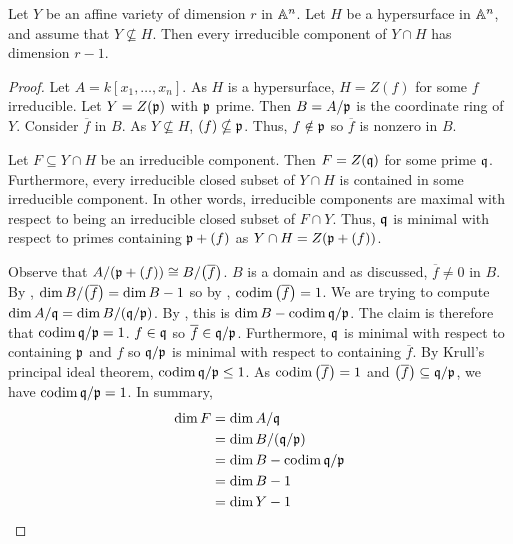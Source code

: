 \label{1.1.8}

Let $Y$ be an affine variety of dimension $r$ in $\mathbb A^n$. Let $H$ be a hypersurface in $\mathbb A^n$, and assume that $Y \nsubseteq H$. Then every irreducible component of $Y \cap H$ has dimension $r - 1$.

\begin{proof}
    Let $A = k[x_1, \dots, x_n]$. As $H$ is a hypersurface, $H = Z(f)$ for some $f$ irreducible. Let $Y = Z(\mathfrak p)$ with $\mathfrak p$ prime. Then $B = A/\mathfrak p$ is the coordinate ring of $Y$. Consider $\overline{f}$ in $B$. As $Y \nsubseteq H$, $(f) \nsubseteq \mathfrak p$. Thus, $f \notin \mathfrak p$ so $\overline{f}$ is nonzero in $B$.
    
    Let $F \subseteq Y \cap H$ be an irreducible component. Then $F = Z(\mathfrak q)$ for some prime $\mathfrak q$. Furthermore, every irreducible closed subset of $Y \cap H$ is contained in some irreducible component. In other words, irreducible components are maximal with respect to being an irreducible closed subset of $F \cap Y$. Thus, $\mathfrak q$ is minimal with respect to primes containing $\mathfrak p + (f)$ as $Y \cap H = Z(\mathfrak p + (f))$.
    
    Observe that $A/(\mathfrak p + (f)) \cong B/{\left(\overline{f}\right)}$. $B$ is a domain and as discussed, $\overline{f} \neq 0$ in $B$. By \cite[13.11]{eisenbudcommutative}, $\dim B/{\left(\overline{f}\right)} = \dim B - 1$ so by \cite[13.4]{eisenbudcommutative}, $\operatorname{codim}{\left(\overline{f}\right)} = 1$. We are trying to compute $\dim A/\mathfrak q = \dim B/(\mathfrak q/\mathfrak p)$. By \cite[13.4]{eisenbudcommutative}, this is $\dim B - \operatorname{codim} \mathfrak q/\mathfrak p$. The claim is therefore that $\operatorname{codim} \mathfrak q/\mathfrak p = 1$. $f \in \mathfrak q$ so $\overline{f} \in \mathfrak q/\mathfrak p$. Furthermore, $\mathfrak q$ is minimal with respect to containing $\mathfrak p$ and $f$ so $\mathfrak q/\mathfrak p$ is minimal with respect to containing $\overline{f}$. By Krull's principal ideal theorem, $\operatorname{codim} \mathfrak q/\mathfrak p \leq 1$. As $\operatorname{codim}{\left(\overline{f}\right)} = 1$ and ${\left(\overline{f}\right)} \subseteq \mathfrak q/\mathfrak p$, we have $\operatorname{codim} \mathfrak q/\mathfrak p = 1$. In summary,
    \begin{align*}
        \dim F &= \dim A/\mathfrak q\\
        &= \dim B/(\mathfrak q/\mathfrak p)\\
        &= \dim B - \operatorname{codim} \mathfrak q/\mathfrak p\\
        &= \dim B - 1\\
        &= \dim Y - 1
    \end{align*}
\end{proof}